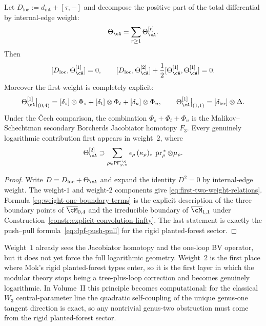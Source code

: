 \begin{proposition}
\label{prop:first-two-weights-log-fm}
Let $D_{\mathrm{loc}}:=d_{\mathrm{int}}+[\tau,-]$ and decompose the positive
part of the total differential by internal-edge weight:
\[
\Theta_\cA=\sum_{r\ge 1}\Theta_\cA^{[r]}.
\]
Then
\begin{equation}
\label{eq:first-two-weight-relations}
[D_{\mathrm{loc}},\Theta_\cA^{[1]}]=0,
\qquad
[D_{\mathrm{loc}},\Theta_\cA^{[2]}]
+\frac12[\Theta_\cA^{[1]},\Theta_\cA^{[1]}]=0.
\end{equation}
Moreover the first weight is completely explicit:
\begin{equation}
\label{eq:weight-one-boundary-terms}
\Theta_\cA^{[1]}\big|_{(0,4)}
=
[\delta_s]\otimes\Phi_s
+
[\delta_t]\otimes\Phi_t
+
[\delta_u]\otimes\Phi_u,
\qquad
\Theta_\cA^{[1]}\big|_{(1,1)}
=
[\delta_{\mathrm{irr}}]\otimes\Delta .
\end{equation}
Under the \v{C}ech comparison, the combination
$\Phi_s+\Phi_t+\Phi_u$ is the Malikov--Schechtman secondary Borcherds
Jacobiator homotopy $F_3$.  Every genuinely logarithmic contribution first
appears in weight~$2$, where
\begin{equation}
\label{eq:weight-two-log-term}
\Theta_\cA^{[2]}
\supset
\sum_{\rho\in \mathsf{PF}^{\mathrm{rig}}_{g,n}}
\epsilon_\rho\,
(\kappa_\rho)_*\,\operatorname{pr}_\rho^{\,*}\otimes\mu_\rho .
\end{equation}
\end{proposition}

\begin{proof}
Write $D=D_{\mathrm{loc}}+\Theta_\cA$ and expand the identity $D^2=0$ by
internal-edge weight.  The weight-$1$ and weight-$2$ components give
\eqref{eq:first-two-weight-relations}.  Formula
\eqref{eq:weight-one-boundary-terms} is the explicit description of the three
boundary points of $\overline{\cM}_{0,4}$ and the irreducible boundary of
$\overline{\cM}_{1,1}$ under
Construction~\ref{constr:explicit-convolution-linfty}.  The last statement is
exactly the push--pull formula~\eqref{eq:dpf-push-pull} for the rigid
planted-forest sector.
\end{proof}

\begin{remark}
\label{rem:first-genuinely-modular}
Weight~$1$ already sees the Jacobiator homotopy and the one-loop BV operator,
but it does not yet force the full logarithmic geometry.  Weight~$2$ is the
first place where Mok's rigid planted-forest types enter, so it is the first
layer in which the modular theory stops being a tree-plus-loop correction and
becomes genuinely logarithmic.  In Volume~II this principle becomes
computational: for the classical $W_3$ central-parameter line the quadratic
self-coupling of the unique genus-one tangent direction is exact, so any
nontrivial genus-two obstruction must come from the rigid planted-forest
sector.
\end{remark}

